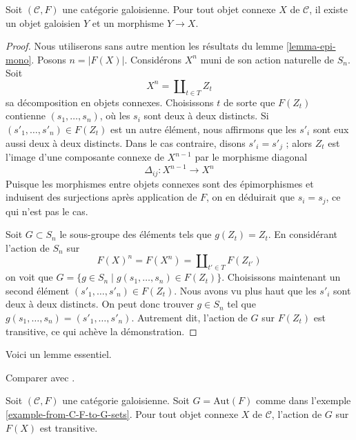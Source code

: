 \begin{lemma}
\label{lemma-galois}
Soit $(\mathcal{C}, F)$ une catégorie galoisienne. Pour tout objet connexe $X$
de $\mathcal{C}$, il existe un objet galoisien $Y$ et un morphisme $Y \to X$.
\end{lemma}

\begin{proof}
Nous utiliserons sans autre mention les résultats du lemme \ref{lemma-epi-mono}.
Posons $n = |F(X)|$. Considérons $X^n$ muni de son action naturelle de
$S_n$. Soit
$$
X^n = \coprod\nolimits_{t \in T} Z_t
$$
sa décomposition en objets connexes. Choisissons $t$ de sorte que
$F(Z_t)$ contienne $(s_1, \ldots, s_n)$, où les $s_i$ sont deux à deux distincts.
Si $(s'_1, \ldots, s'_n) \in F(Z_t)$ est un autre élément, nous
affirmons que les $s'_i$ sont eux aussi deux à deux distincts. Dans le cas contraire, disons
$s'_i = s'_j$ ; alors $Z_t$ est l'image d'une composante connexe de
$X^{n - 1}$ par le morphisme diagonal
$$
\Delta_{ij} : X^{n - 1} \longrightarrow X^n
$$
Puisque les morphismes entre objets connexes sont des épimorphismes et induisent
des surjections après application de $F$, on en déduirait que $s_i = s_j$,
ce qui n'est pas le cas.

\medskip\noindent
Soit $G \subset S_n$ le sous-groupe des éléments tels que $g(Z_t) = Z_t$.
En considérant l'action de $S_n$ sur
$$
F(X)^n = F(X^n) = \coprod\nolimits_{t' \in T} F(Z_{t'})
$$
on voit que $G = \{g \in S_n \mid g(s_1, \ldots, s_n) \in F(Z_t)\}$.
Choisissons maintenant un second élément $(s'_1, \ldots, s'_n) \in F(Z_t)$.
Nous avons vu plus haut que les $s'_i$ sont deux à deux distincts. On peut donc
trouver $g \in S_n$ tel que $g(s_1, \ldots, s_n) = (s'_1, \ldots, s'_n)$.
Autrement dit, l'action de $G$ sur $F(Z_t)$ est transitive, ce qui
achève la démonstration.
\end{proof}

\noindent
Voici un lemme essentiel.

\begin{lemma}
\label{lemma-tame}
\begin{reference}
Comparer avec \cite[Définition 7.2.4]{BS}.
\end{reference}
Soit $(\mathcal{C}, F)$ une catégorie galoisienne. Soit $G = \text{Aut}(F)$
comme dans l'exemple \ref{example-from-C-F-to-G-sets}. Pour tout objet connexe
$X$ de $\mathcal{C}$, l'action de $G$ sur $F(X)$ est transitive.
\end{lemma}

